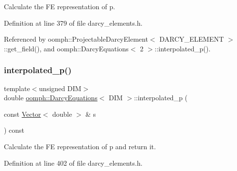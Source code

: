 Calculate the FE representation of p. 



Definition at line 379 of file darcy\+\_\+elements.\+h.



Referenced by oomph\+::\+Projectable\+Darcy\+Element$<$ D\+A\+R\+C\+Y\+\_\+\+E\+L\+E\+M\+E\+N\+T $>$\+::get\+\_\+field(), and oomph\+::\+Darcy\+Equations$<$ 2 $>$\+::interpolated\+\_\+p().

\mbox{\label{classoomph_1_1DarcyEquations_a564a225d0e00cf5923ef725b73a68fda}} 
\subsubsection{\texorpdfstring{interpolated\+\_\+p()}{interpolated\_p()}\hspace{0.1cm}{\footnotesize\ttfamily [2/2]}}
{\footnotesize\ttfamily template$<$unsigned D\+IM$>$ \\
double \hyperlink{classoomph_1_1DarcyEquations}{oomph\+::\+Darcy\+Equations}$<$ D\+IM $>$\+::interpolated\+\_\+p (\begin{DoxyParamCaption}\item[{const \hyperlink{classoomph_1_1Vector}{Vector}$<$ double $>$ \&}]{s }\end{DoxyParamCaption}) const\hspace{0.3cm}{\ttfamily [inline]}}



Calculate the FE representation of p and return it. 



Definition at line 402 of file darcy\+\_\+elements.\+h.

\mbox{\label{classoomph_1_1DarcyEquations_a60153f3aba6a1b68b09ea175f41b9edf}} 
